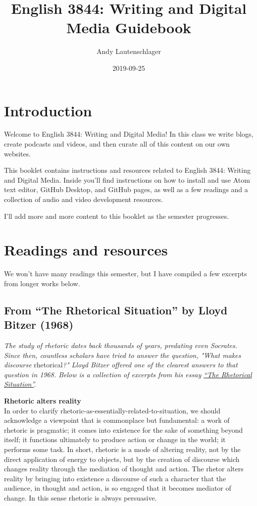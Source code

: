 \documentclass[]{book}
\title{English 3844: Writing and Digital Media Guidebook}
\author{Andy Lautenschlager}
\date{2019-09-25}
\theoremstyle{definition}
\theoremstyle{definition}
\theoremstyle{definition}
\theoremstyle{remark}
\begin{document}
\maketitle

{
\setcounter{tocdepth}{1}
\tableofcontents
}
\hypertarget{introduction}{%
\chapter{Introduction}\label{introduction}}

Welcome to English 3844: Writing and Digital Media! In this class we
write blogs, create podcasts and videos, and then curate all of this
content on our own websites.

This booklet contains instructions and resources related to English
3844: Writing and Digital Media. Inside you'll find instructions on how
to install and use Atom text editor, GitHub Desktop, and GitHub pages,
as well as a few readings and a collection of audio and video
development resources.

I'll add more and more content to this booklet as the semester
progresses.

\hypertarget{readings}{%
\chapter{Readings and resources}\label{readings}}

We won't have many readings this semester, but I have compiled a few
excerpts from longer works below.

\hypertarget{from-the-rhetorical-situation-by-lloyd-bitzer-1968}{%
\section{From ``The Rhetorical Situation'' by Lloyd Bitzer
(1968)}\label{from-the-rhetorical-situation-by-lloyd-bitzer-1968}}

\emph{The study of rhetoric dates back thousands of years, predating
even Socrates. Since then, countless scholars have tried to answer the
question, "What makes discourse} rhetorical\emph{?" Lloyd Bitzer offered
one of the clearest answers to that question in 1968. Below is a
collection of excerpts from his essay
\href{http://www.arts.uwaterloo.ca/~raha/309CWeb/Bitzer(1968).pdf}{``The
Rhetorical Situation''}.}

\textbf{Rhetoric alters reality}\\
In order to clarify rhetoric-as-essentially-related-to-situation, we
should acknowledge a viewpoint that is commonplace but fundamental: a
work of rhetoric is pragmatic; it comes into existence for the sake of
something beyond itself; it functions ultimately to produce action or
change in the world; it performs some task. In short, rhetoric is a mode
of altering reality, not by the direct application of energy to objects,
but by the creation of discourse which changes reality through the
mediation of thought and action. The rhetor alters reality by bringing
into existence a discourse of such a character that the audience, in
thought and action, is so engaged that it becomes mediator of change. In
this sense rhetoric is always persuasive.
\end{document}
